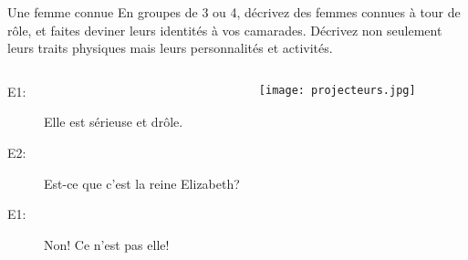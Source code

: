 \begin{frame}{Une femme connue}
  En groupes de 3 ou 4, décrivez des femmes connues à tour de rôle, et faites deviner leurs identités à vos camarades. Décrivez non seulement leurs traits physiques mais leurs personnalités et activités. \\
  \begin{columns}
      \begin{description}
        \item[E1:] Elle est sérieuse et drôle.
        \item[] 
        \item[E2:] Est-ce que c'est la reine Elizabeth?
        \item[] 
        \item[E1:] Non! Ce n'est pas elle!
        \item[] 
      \end{description}
      \begin{center}
        \texttt{[image: projecteurs.jpg]}
      \end{center}
  \end{columns}
\end{frame}